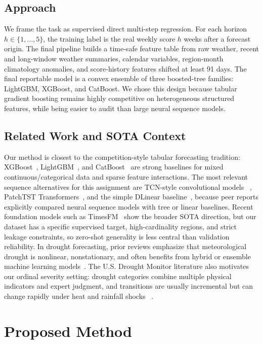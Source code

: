 \documentclass[conference]{IEEEtran}
\begin{document}
\subsection{Approach}
We frame the task as supervised direct multi-step regression. For each horizon
$h \in \{1,\ldots,5\}$, the training label is the real weekly score $h$ weeks
after a forecast origin. The final pipeline builds a time-safe feature table
from raw weather, recent and long-window weather summaries, calendar variables,
region-month climatology anomalies, and score-history features shifted at
least 91 days. The final reportable model is a convex ensemble of three
boosted-tree families: LightGBM, XGBoost, and CatBoost. We chose this design
because tabular gradient boosting remains highly competitive on heterogeneous
structured features, while being easier to audit than large neural sequence
models.

\subsection{Related Work and SOTA Context}
Our method is closest to the competition-style tabular forecasting tradition:
XGBoost~\cite{chen2016xgboost}, LightGBM~\cite{ke2017lightgbm}, and
CatBoost~\cite{prokhorenkova2018catboost} are strong baselines for mixed
continuous/categorical data and sparse feature interactions. The most relevant
sequence alternatives for this assignment are TCN-style convolutional models
~\cite{bai2018tcn}, PatchTST Transformers~\cite{nie2023patchtst}, and the
simple DLinear baseline~\cite{zeng2023dlinear}, because peer reports explicitly
compared neural sequence models with tree or linear baselines. Recent foundation
models such as TimesFM~\cite{das2024timesfm} show the broader SOTA direction,
but our dataset has a specific supervised target, high-cardinality regions, and
strict leakage constraints, so zero-shot generality is less central than
validation reliability.
In drought forecasting, prior reviews emphasize that meteorological drought is
nonlinear, nonstationary, and often benefits from hybrid or ensemble machine
learning models~\cite{alawsi2022drought}. The U.S. Drought Monitor literature
also motivates our ordinal severity setting: drought categories combine
multiple physical indicators and expert judgment, and transitions are usually
incremental but can change rapidly under heat and rainfall shocks
~\cite{svoboda2002droughtmonitor}.

\section{Proposed Method}
\end{document}
